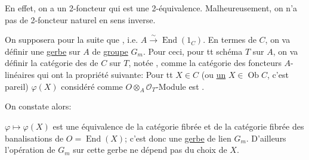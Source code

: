 En effet, on a un  2-foncteur
qui est une 2-équivalence. Malheureusement, on n'a pas de 2-foncteur naturel en sens inverse.

On supposera pour la suite que  , i.e. $A\xrightarrow{\sim}\operatorname{End}(1_C)$.
En termes de $C$, on va définir une \uline{gerbe} sur $A$ de \uline{groupe} $G_m$. Pour ceci, pour tt schéma  $T$ sur $A$, on va définir la catégorie des    de $C$ sur $T$, notée  , comme la catégorie des foncteurs $A$-  linéaires
qui ont la propriété suivante: Pour tt $X\in C$ (ou \uline{un} $X\in\operatorname{Ob}C$, c'est pareil)   $\varphi(X)$ considéré comme \deleted{\unsure{\varphi}} $O\otimes_A\mathcal O_T$-Module est  .

On constate alors:   

 $\varphi\longmapsto\varphi(X)$ est une équivalence de la catégorie fibrée   et de la catégorie fibrée des banalisations de $O=\operatorname{End}(X)$; c'est donc une \uline{gerbe} de lien $G_m$. D'ailleurs l'opération de $G_m$ sur cette gerbe ne dépend pas du choix de $X$.
